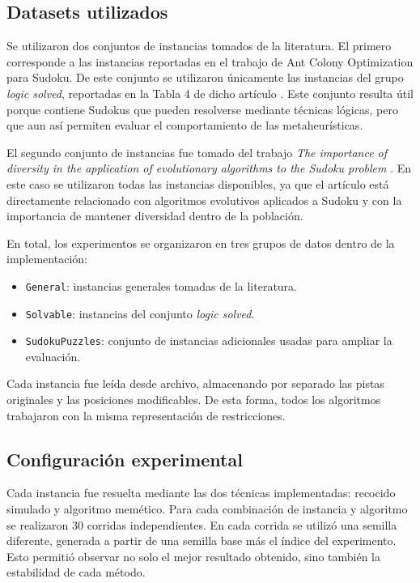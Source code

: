 \documentclass{article}
\begin{document}
\subsection{Datasets utilizados}

Se utilizaron dos conjuntos de instancias tomados de la literatura. El primero corresponde a las instancias reportadas en el trabajo de Ant Colony Optimization para Sudoku. De este conjunto se utilizaron únicamente las instancias del grupo \textit{logic solved}, reportadas en la Tabla 4 de dicho artículo \cite{lloyd2019aco}. Este conjunto resulta útil porque contiene Sudokus que pueden resolverse mediante técnicas lógicas, pero que aun así permiten evaluar el comportamiento de las metaheurísticas.

El segundo conjunto de instancias fue tomado del trabajo \textit{The importance of diversity in the application of evolutionary algorithms to the Sudoku problem} \cite{segura2016diversity}. En este caso se utilizaron todas las instancias disponibles, ya que el artículo está directamente relacionado con algoritmos evolutivos aplicados a Sudoku y con la importancia de mantener diversidad dentro de la población.

En total, los experimentos se organizaron en tres grupos de datos dentro de la implementación:

\begin{itemize}
    \item \texttt{General}: instancias generales tomadas de la literatura.
    \item \texttt{Solvable}: instancias del conjunto \textit{logic solved}.
    \item \texttt{SudokuPuzzles}: conjunto de instancias adicionales usadas para ampliar la evaluación.
\end{itemize}

Cada instancia fue leída desde archivo, almacenando por separado las pistas originales y las posiciones modificables. De esta forma, todos los algoritmos trabajaron con la misma representación de restricciones.

\subsection{Configuración experimental}

Cada instancia fue resuelta mediante las dos técnicas implementadas: recocido simulado y algoritmo memético. Para cada combinación de instancia y algoritmo se realizaron 30 corridas independientes. En cada corrida se utilizó una semilla diferente, generada a partir de una semilla base más el índice del experimento. Esto permitió observar no solo el mejor resultado obtenido, sino también la estabilidad de cada método.
\end{document}
